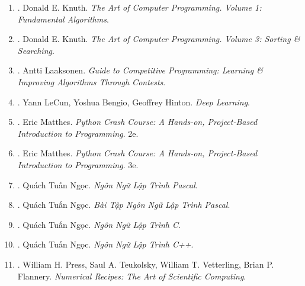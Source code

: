 \documentclass{article}
\begin{document}
\begin{enumerate}
	\item \cite{Knuth1997}. Donald E. Knuth. {\it The Art of Computer Programming. Volume 1: Fundamental Algorithms}.\hfill{\sf[reading]}

	\item \cite{Knuth1998}. Donald E. Knuth. {\it The Art of Computer Programming. Volume 3: Sorting \& Searching}.\hfill{\sf[reading]}

	\item \cite{Laaksonen2020,Laaksonen2024}. {\sc Antti Laaksonen}. {\it Guide to Competitive Programming: Learning \& Improving Algorithms Through Contests}.\hfill{\sf[reading]}

	\item \cite{LeCun_Bengio_Hinton2015}. Yann LeCun, Yoshua Bengio, Geoffrey Hinton. {\it Deep Learning}.\hfill{\sf[reading]}

	\item \cite{Matthes2019}. Eric Matthes. {\it Python Crash Course: A Hands-on, Project-Based Introduction to Programming}. 2e.\hfill{\sf[reading]}

	\item \cite{Matthes2023}. Eric Matthes. {\it Python Crash Course: A Hands-on, Project-Based Introduction to Programming}. 3e.\hfill{\sf[reading]}

	\item \cite{Ngoc_Pascal}. Quách Tuấn Ngọc. {\it Ngôn Ngữ Lập Trình Pascal}.\hfill{\sf[done]}

	\item \cite{Ngoc_BT_Pascal}. Quách Tuấn Ngọc. {\it Bài Tập Ngôn Ngữ Lập Trình Pascal}.\hfill{\sf[done]}

	\item \cite{Ngoc_C}. Quách Tuấn Ngọc. {\it Ngôn Ngữ Lập Trình C}.\hfill{\sf[done]}

	\item \cite{Ngoc_C++}. Quách Tuấn Ngọc. {\it Ngôn Ngữ Lập Trình C++}.\hfill{\sf[done]}

	\item \cite{Press_Teukolsky_Vetterling_Flannery_recipe_C++}. {\sc William H. Press, Saul A. Teukolsky, William T. Vetterling, Brian P. Flannery}. {\it Numerical Recipes: The Art of Scientific Computing}. {}


\end{enumerate}
\end{document}
